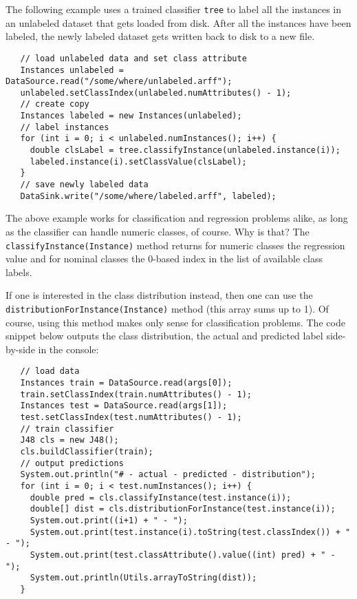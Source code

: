 The following example uses a trained classifier \texttt{tree} to label all the
instances in an unlabeled dataset that gets loaded from disk. After all the
instances have been labeled, the newly labeled dataset gets written back to
disk to a new file.
\begin{verbatim}
   // load unlabeled data and set class attribute
   Instances unlabeled = DataSource.read("/some/where/unlabeled.arff"); 
   unlabeled.setClassIndex(unlabeled.numAttributes() - 1);
   // create copy
   Instances labeled = new Instances(unlabeled);
   // label instances
   for (int i = 0; i < unlabeled.numInstances(); i++) {
     double clsLabel = tree.classifyInstance(unlabeled.instance(i));
     labeled.instance(i).setClassValue(clsLabel);
   }
   // save newly labeled data
   DataSink.write("/some/where/labeled.arff", labeled);
\end{verbatim}
The above example works for classification and regression problems alike, as
long as the classifier can handle numeric classes, of course. Why is that? The
\texttt{classifyInstance(Instance)} method returns for numeric classes the
regression value and for nominal classes the 0-based index in the list of
available class labels.

If one is interested in the class distribution instead, then one can use the
\texttt{distributionForInstance(Instance)} method (this array sums up to 1). Of
course, using this method makes only sense for classification problems. The code
snippet below outputs the class distribution, the actual and predicted label
side-by-side in the console:
\begin{verbatim}
   // load data
   Instances train = DataSource.read(args[0]);
   train.setClassIndex(train.numAttributes() - 1);
   Instances test = DataSource.read(args[1]);
   test.setClassIndex(test.numAttributes() - 1);
   // train classifier
   J48 cls = new J48();
   cls.buildClassifier(train);
   // output predictions
   System.out.println("# - actual - predicted - distribution");
   for (int i = 0; i < test.numInstances(); i++) {
     double pred = cls.classifyInstance(test.instance(i));
     double[] dist = cls.distributionForInstance(test.instance(i));
     System.out.print((i+1) + " - ");
     System.out.print(test.instance(i).toString(test.classIndex()) + " - ");
     System.out.print(test.classAttribute().value((int) pred) + " - ");
     System.out.println(Utils.arrayToString(dist));
   }
\end{verbatim}

\newpage

